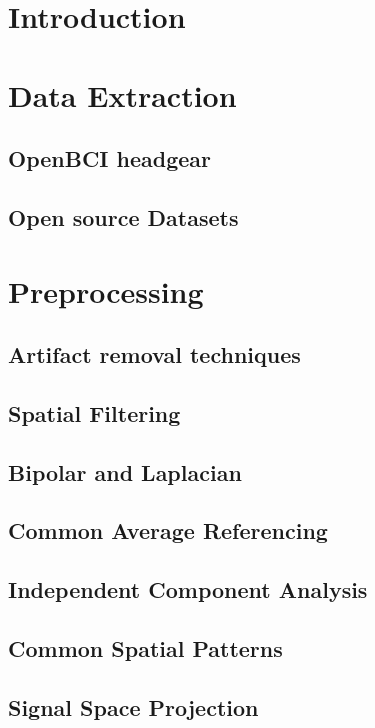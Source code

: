 \section*{Introduction}

\section{Data Extraction}

\subsection{OpenBCI headgear}

\subsection{Open source Datasets}

\section{Preprocessing}

\subsection{Artifact removal techniques}

\subsection{Spatial Filtering}

\subsection{Bipolar and Laplacian}

\subsection{Common Average Referencing}

\subsection{Independent Component Analysis}

\subsection{Common Spatial Patterns}

\subsection{Signal Space Projection}

